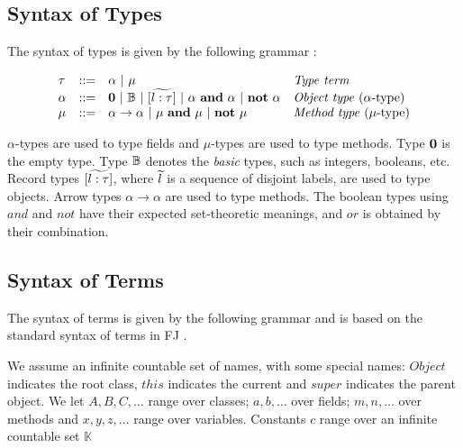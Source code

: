 \documentclass{l4proj}
\begin{document}
\subsection{Syntax of Types}

The syntax of types is given by the following grammar \citep{Dardha2013,Dardha2017}:

\begin{equation}
    \label{eq:syntaxtypes}
    \begin{array}{llll}
        \tau   & ::=                                          & \alpha \ |\ \mu
               & \mbox{\textit{Type term}}
        \\
        \alpha & ::=                                          & \zero \ |\ \btypes \ |\ [\wt{l:\tau}] \ |\ \alpha \ \bf{and}\ \alpha \ |\ \bf{not}\ \alpha
               & \mbox{\textit{Object type} ($\alpha $-type)}
        \\
        \mu    & ::=                                          & \alpha \to \alpha \ |\ \mu \ \bf{and}\ \mu \ |\ \bf{not}\ \mu
               & \mbox{\textit{Method type} ($\mu $-type)}
    \end{array}
\end{equation}

$\alpha$-types are used to type fields and $\mu$-types are used to type methods.
Type $\mathbf{0}$ is the empty type.
Type ${\mathbb B}$ denotes the \emph{basic} types, such as integers, booleans, etc.
Record types $[\widetilde{l:\tau}]$, where $\widetilde{l}$ is a sequence of disjoint labels, are used to type objects.
Arrow types $\alpha \to \alpha$ are used to type methods.
The boolean types using ${and}$ and ${not}$ have their expected set-theoretic meanings, and ${or}$ is obtained by their combination.

\subsection{Syntax of Terms}

The syntax of terms is given by the following grammar and is based on the standard syntax of terms in FJ \cite{Igarashi1999,Dardha2013,Dardha2017}.

We assume an infinite countable set of names, with some special names: $\mathit{Object}$ indicates the root class, $\mathit{this}$  indicates the current and $\mathit{super}$ indicates the parent object.
We let  $A, B, C, \ldots$ range over classes; $a, b, \ldots$ over fields; $m, n, \ldots$ over methods and $x, y, z, \ldots$ range over variables. Constants $c$ range over an infinite countable set $\mathbb{K}$
\end{document}
